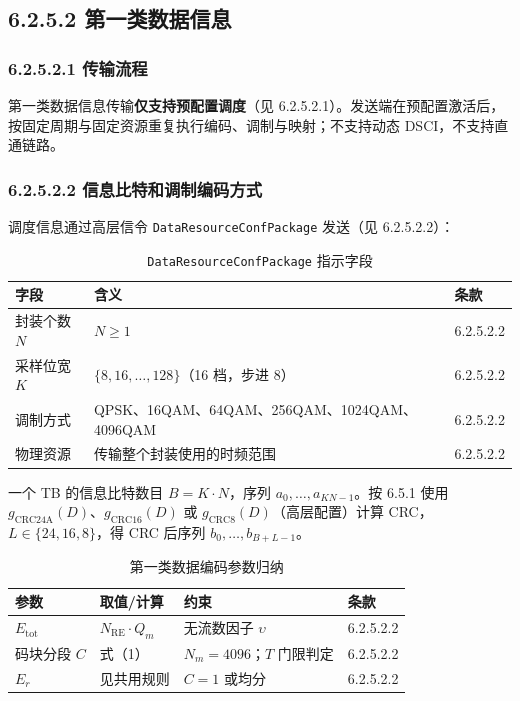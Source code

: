 \documentclass[11pt,a4paper]{ctexart}
\begin{document}
\subsection{6.2.5.2 第一类数据信息}

\subsubsection{6.2.5.2.1 传输流程}

第一类数据信息传输\textbf{仅支持预配置调度}（见 6.2.5.2.1）。发送端在预配置激活后，按固定周期与固定资源重复执行编码、调制与映射；不支持动态 DSCI，不支持直通链路。

\subsubsection{6.2.5.2.2 信息比特和调制编码方式}

调度信息通过高层信令 \texttt{DataResourceConfPackage} 发送（见 6.2.5.2.2）：

\begin{table}[h]
\centering
\small
\caption{\texttt{DataResourceConfPackage} 指示字段}
\begin{tabular}{L{4cm}L{5cm}L{3.5cm}}
\toprule
\textbf{字段} & \textbf{含义} & \textbf{条款} \\
\midrule
封装个数 $N$ & $N \geq 1$ & 6.2.5.2.2 \\
采样位宽 $K$ & $\{8,16,\ldots,128\}$（16 档，步进 8） & 6.2.5.2.2 \\
调制方式 & QPSK、16QAM、64QAM、256QAM、1024QAM、4096QAM & 6.2.5.2.2 \\
物理资源 & 传输整个封装使用的时频范围 & 6.2.5.2.2 \\
\bottomrule
\end{tabular}
\end{table}

一个 TB 的信息比特数目 $B = K \cdot N$，序列 $a_0,\ldots,a_{KN-1}$。按 6.5.1 使用 $g_{\mathrm{CRC24A}}(D)$、$g_{\mathrm{CRC16}}(D)$ 或 $g_{\mathrm{CRC8}}(D)$（高层配置）计算 CRC，$L \in \{24,16,8\}$，得 CRC 后序列 $b_0,\ldots,b_{B+L-1}$。

\begin{table}[h]
\centering
\small
\caption{第一类数据编码参数归纳}
\begin{tabular}{llll}
\toprule
\textbf{参数} & \textbf{取值/计算} & \textbf{约束} & \textbf{条款} \\
\midrule
$E_{\mathrm{tot}}$ & $N_{\mathrm{RE}} \cdot Q_m$ & 无流数因子 $\upsilon$ & 6.2.5.2.2 \\
码块分段 $C$ & 式（1） & $N_m=4096$；$T$ 门限判定 & 6.2.5.2.2 \\
$E_r$ & 见共用规则 & $C=1$ 或均分 & 6.2.5.2.2 \\
\bottomrule
\end{tabular}
\end{table}
\end{document}
